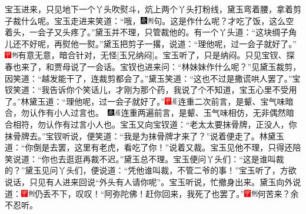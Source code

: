 宝玉进来，只见地下一个丫头吹熨斗，炕上两个丫头打粉线，黛玉弯着腰，拿着剪子裁什么呢。宝玉走进来笑道：“哦，{\includegraphics[width=3mm]{../Images/00004}\includegraphics[width=3mm]{../Images/00011}\footnotesize \kaishu 句。}这是作什么呢？才吃了饭，这么空着头，一会子又头疼了。”黛玉并不理，只管裁他的。有一个丫头道：“这块绸子角儿还不好呢，再熨他一熨。”黛玉把剪子一撂，说道：“理他呢，过一会子就好了。”{\includegraphics[width=3mm]{../Images/00002}\includegraphics[width=3mm]{../Images/00011}\footnotesize \kaishu 有意无意，暗合针对，无怪{[}玉兄纳闷{]}。}宝玉听了，只是纳闷。只见宝钗、探春也来了，和贾母说了一会话。宝钗也进来问：“林妹妹作什么呢？”见黛玉裁剪，因笑道：“越发能干了，连裁剪都会了。”黛玉笑道：“这也不过是撒谎哄人罢了。”宝钗笑道：“我告诉你个笑话儿，才刚为那个药，我说了个不知道，宝玉心里不受用了。”林黛玉道：“理他呢，过一会子就好了。”{\includegraphics[width=3mm]{../Images/00002}\includegraphics[width=3mm]{../Images/00010}\footnotesize \kaishu 连重二次前言，是颦、宝气味暗合，勿认作有小人过言也。　\includegraphics[width=3mm]{../Images/00004}\includegraphics[width=3mm]{../Images/00010}\footnotesize \kaishu 连重两遍前言，是颦、玉气味相仿，无非偶然暗合相符，勿认作有过言小人也。}宝玉又向宝钗道：“老太太要抹骨牌，正没人，你抹骨牌去。”宝钗听说，便笑道：“我是为抹骨牌才来了？”说着便走了。林黛玉道：“你倒是去罢，这里有老虎，看吃了你！”说着又裁。宝玉见他不理，只得还陪笑说道：“你也去逛逛再裁不迟。”黛玉总不理。宝玉便问丫头们：“这是谁叫裁的？”黛玉见问丫头们，便说道：“凭他谁叫裁，不管二爷的事！”宝玉听了，方欲说话，只见有人进来回说“外头有人请你呢”。宝玉听说，忙撤身出来。黛玉向外说道：{\includegraphics[width=3mm]{../Images/00002}\includegraphics[width=3mm]{../Images/00011}\footnotesize \kaishu 仍丢不下，叹叹！}“阿弥陀佛！赶你回来，我死了也罢了。”{\includegraphics[width=3mm]{../Images/00002}\includegraphics[width=3mm]{../Images/00011}\footnotesize \kaishu 何苦来？余不忍听。}

